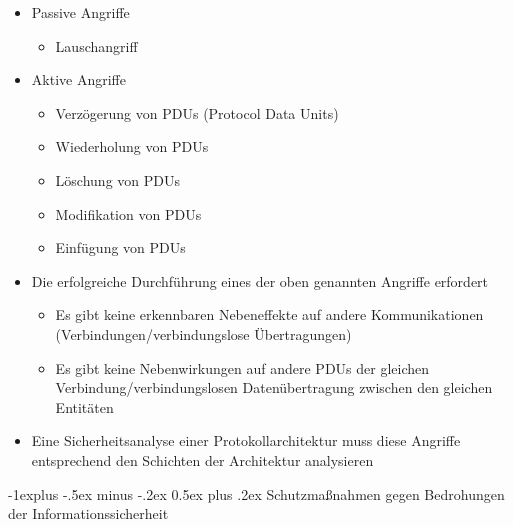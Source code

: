 \documentclass[a4paper]{article}
\makeatletter
\renewcommand{\subsection}{\@startsection{subsection}{2}{0mm}%
 {-1explus -.5ex minus -.2ex}%
 {0.5ex plus .2ex}%
 {\normalfont\normalsize\bfseries}}
\makeatother
\begin{document}
\begin{multicols}{3}
    \begin{itemize}
        \item
              Passive Angriffe

              \begin{itemize}
                  \item
                        Lauschangriff
              \end{itemize}
        \item
              Aktive Angriffe

              \begin{itemize}
                  \item
                        Verzögerung von PDUs (Protocol Data Units)
                  \item
                        Wiederholung von PDUs
                  \item
                        Löschung von PDUs
                  \item
                        Modifikation von PDUs
                  \item
                        Einfügung von PDUs
              \end{itemize}
        \item
              Die erfolgreiche Durchführung eines der oben genannten Angriffe
              erfordert

              \begin{itemize}
                  \item
                        Es gibt keine erkennbaren Nebeneffekte auf andere Kommunikationen
                        (Verbindungen/verbindungslose Übertragungen)
                  \item
                        Es gibt keine Nebenwirkungen auf andere PDUs der gleichen
                        Verbindung/verbindungslosen Datenübertragung zwischen den gleichen
                        Entitäten
              \end{itemize}
        \item
              Eine Sicherheitsanalyse einer Protokollarchitektur muss diese Angriffe
              entsprechend den Schichten der Architektur analysieren
    \end{itemize}


    \subsection{Schutzmaßnahmen gegen Bedrohungen der
        Informationssicherheit}


\end{multicols}
\end{document}
